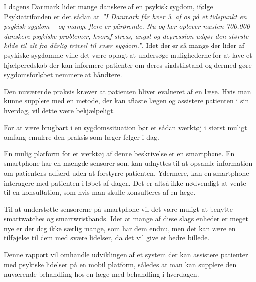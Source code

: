 


I dagens Danmark lider mange danskere af en psykisk sygdom, ifølge Psykiatrifonden er det sådan at \textit{''I Danmark får hver 3. af os på et tidspunkt en psykisk sygdom – og mange flere er pårørende. 
Nu og her oplever næsten 700.000 danskere psykiske problemer, hvoraf stress, angst og depression udgør den største kilde til alt fra dårlig trivsel til svær sygdom.''}\cite{psykiatrifonden}.
Idet der er så mange der lider af psykiske sygdomme ville det være oplagt at undersøge mulighederne for at lave et hjælperedskab der kan informere patienter om deres sindstilstand og dermed gøre sygdomsforløbet nemmere at håndtere.

Den nuværende praksis kræver at patienten bliver evalueret af en læge.
Hvis man kunne supplere med en metode, der kan aflaste lægen og assistere patienten i sin hverdag, vil dette være behjælpeligt. 

For at være brugbart i en sygdomssituation bør et sådan værktøj i størst muligt omfang emulere den praksis som læger følger i dag.

En mulig platform for et værktøj af denne beskrivelse er en smartphone.
En smartphone har en mængde sensorer som kan udnyttes til at opsamle information om patientens adfærd uden at forstyrre patienten.
Ydermere, kan en smartphone interagere med patienten i løbet af dagen. 
Det er altså ikke nødvendigt at vente til en konsultation, som hvis man skulle konsulteres af en læge.

Til at understøtte sensorerne på smartphone vil det være muligt at benytte smartwatches og smartwristbands.
Idet at mange af disse slags enheder er meget nye er der dog ikke særlig mange, som har dem endnu, men det kan være en tilføjelse til dem med svære lidelser, da det vil give et bedre billede.

Denne rapport vil omhandle udviklingen af et system der kan assistere patienter med psykiske lidelser på en mobil platform, således at man kan supplere den nuværende behandling hos en læge med behandling i hverdagen.